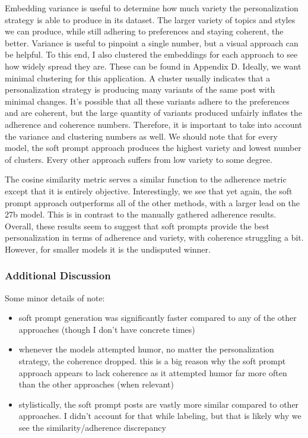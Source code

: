 \documentclass[11pt]{article}
\begin{document}
Embedding variance is useful to determine how much variety the personalization strategy is able to produce in its dataset. The larger variety of topics and styles we can produce, while still adhering to preferences and staying coherent, the better. Variance is useful to pinpoint a single number, but a visual approach can be helpful. To this end, I also clustered the embeddings for each approach to see how widely spread they are. These can be found in Appendix D. Ideally, we want minimal clustering for this application. A cluster usually indicates that a personalization strategy is producing many variants of the same post with minimal changes. It's possible that all these variants adhere to the preferences and are coherent, but the large quantity of variants produced unfairly inflates the adherence and coherence numbers. Therefore, it is important to take into account the variance and clustering numbers as well. We should note that for every model, the soft prompt approach produces the highest variety and lowest number of clusters. Every other approach suffers from low variety to some degree.

The cosine similarity metric serves a similar function to the adherence metric except that it is entirely objective. Interestingly, we see that yet again, the soft prompt approach outperforms all of the other methods, with a larger lead on the 27b model. This is in contrast to the manually gathered adherence results. Overall, these results seem to suggest that soft prompts provide the best personalization in terms of adherence and variety, with coherence struggling a bit. However, for smaller models it is the undisputed winner.

\subsubsection*{Additional Discussion}

Some minor details of note:
\begin{itemize}
    \item soft prompt generation was significantly faster compared to any of the other approaches (though I don't have concrete times)
    \item whenever the models attempted humor, no matter the personalization strategy, the coherence dropped. this is a big reason why the soft prompt approach appears to lack coherence as it attempted humor far more often than the other approaches (when relevant)
    \item stylistically, the soft prompt posts are vastly more similar compared to other approaches. I didn't account for that while labeling, but that is likely why we see the similarity/adherence discrepancy
\end{itemize}
\end{document}
